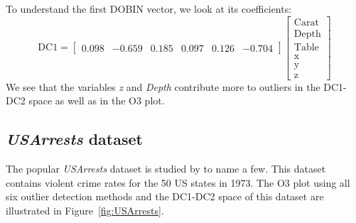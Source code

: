 \documentclass[a4paper,11pt]{article}
\begin{document}
\noindent
To understand the first DOBIN vector, we look at its coefficients:
\begin{equation}\label{eq:ResWithVis2}
    \text{DC1} = \begin{bmatrix}
    0.098 & -0.659 &  0.185 & 0.097  & 0.126 & -0.704  
    \end{bmatrix}
    \begin{bmatrix}
    \text{Carat} \\
    \text{Depth} \\
    \text{Table} \\
    \text{x} \\
    \text{y} \\
    \text{z}
    \end{bmatrix}
\end{equation}
We see that the variables \textit{z} and \textit{Depth} contribute more  to  outliers in the DC1-DC2 space as well as in the O3 plot. 


\subsection{\textit{USArrests} dataset}\label{sec:ResWithVis3}
The popular \textit{USArrests} dataset  is studied by \cite{bailey1995interactive, sarkar2008labels, yaminiviolent} to name a few. This dataset contains violent crime rates for the 50 US states in 1973. The O3 plot using all six outlier detection methods and the DC1-DC2 space of this dataset are illustrated in Figure~\ref{fig:USArrests}. 
\end{document}
